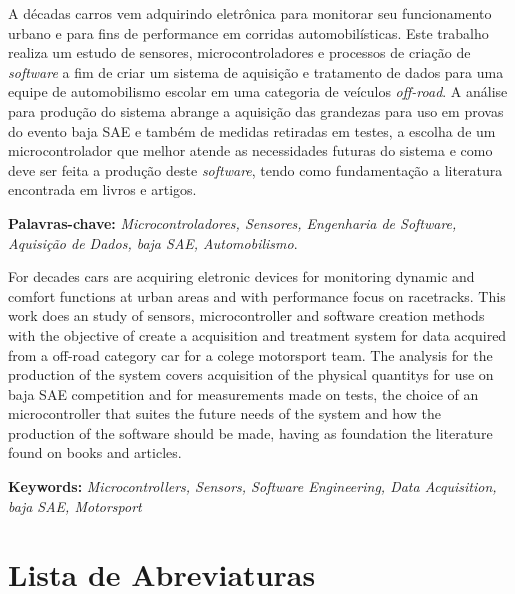 


\noindent A décadas carros vem adquirindo eletrônica para monitorar seu funcionamento urbano e para fins de performance em corridas automobilísticas. Este trabalho realiza um estudo de sensores, microcontroladores e processos de criação de \textit{software} a fim de criar um sistema de aquisição e tratamento de dados para uma equipe de automobilismo escolar em uma categoria de veículos \textit{off-road}. A análise para produção do sistema abrange a aquisição das grandezas para uso em provas do evento baja SAE e também de medidas retiradas em testes, a escolha de um microcontrolador que melhor atende as necessidades futuras do sistema e como deve ser feita a produção deste \textit{software}, tendo como fundamentação a literatura encontrada em livros e artigos.  

\textbf{Palavras-chave:} \textit{Microcontroladores, Sensores, Engenharia de Software, Aquisição de Dados, baja SAE, Automobilismo}.



\noindent For decades cars are acquiring eletronic devices for monitoring dynamic and comfort functions at urban areas and with performance focus on racetracks. This work does an study of sensors, microcontroller and software creation methods with the objective of create a acquisition and treatment system for data acquired from a off-road category car for a colege motorsport team. The analysis for the production of the system covers acquisition of the physical quantitys for use on baja SAE competition and for measurements made on tests, the choice of an microcontroller that suites the future needs of the system and how the production of the software should be made, having as foundation the literature found on books and articles.   


\noindent \textbf{Keywords:} \textit{Microcontrollers, Sensors, Software Engineering, Data Acquisition, baja SAE, Motorsport} 

\tableofcontents
\listoffigures
\listoftables
\newpage
\chapter*{Lista de Abreviaturas\hfill} 
\listofsymbols

\newpage
\pagestyle{myheadings}
